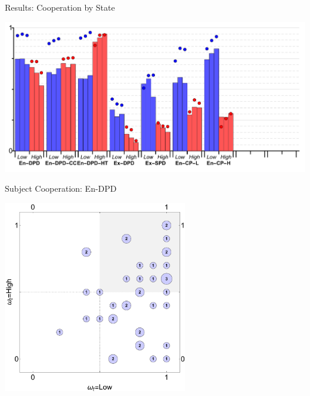 \documentclass{beamer}
\begin{document}
\begin{frame}{Results: Cooperation by State}
\begin{card}
\begin{center}
	\includegraphics[width=1.0\textwidth]{./i/col_bar_StateCoop_block_CP_H.pdf}
\end{center}
\end{card}
\end{frame}
\begin{frame}{Subject Cooperation: En-DPD}
\begin{card}
\begin{center}
	\includegraphics[width=0.6\textwidth]{./i/col_subject_stateCooperation_L5_EnDPD_2.pdf}
\end{center}
\end{card}
\end{frame}
\end{document}
